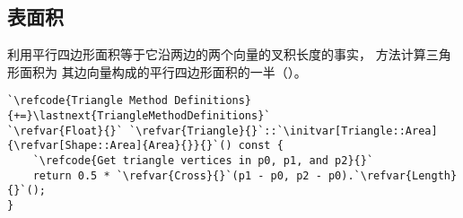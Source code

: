 \subsection{表面积}\label{sub:表面积6}
利用平行四边形面积等于它沿两边的两个向量的叉积长度的事实，
方法计算三角形面积为
其边向量构成的平行四边形面积的一半（）。
\begin{lstlisting}
`\refcode{Triangle Method Definitions}{+=}\lastnext{TriangleMethodDefinitions}`
`\refvar{Float}{}` `\refvar{Triangle}{}`::`\initvar[Triangle::Area]{\refvar[Shape::Area]{Area}{}}{}`() const {
    `\refcode{Get triangle vertices in p0, p1, and p2}{}`
    return 0.5 * `\refvar{Cross}{}`(p1 - p0, p2 - p0).`\refvar{Length}{}`();
}
\end{lstlisting}